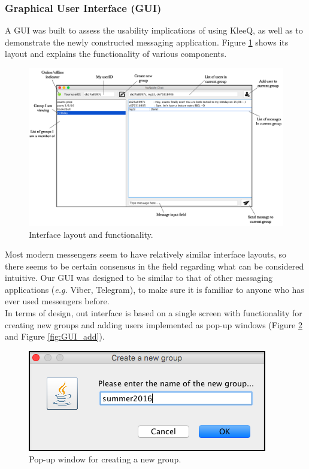 \documentclass[a4paper, 12pt]{report}
\begin{document}
\subsubsection{Graphical User Interface (GUI)}
A GUI was built to assess the usability implications of using KleeQ, as well as to demonstrate the newly constructed messaging application. Figure \ref{fig:GUI} shows its layout and explains the functionality of various components.
\begin{figure}[H]
    \captionsetup{width=0.84\textwidth}
    \centering
    \includegraphics[width=0.94\linewidth]{pics/GUI.png}
    \caption{\label{fig:GUI} Interface layout and functionality.}
\end{figure}
Most modern messengers seem to have relatively similar interface layouts, so there seems to be certain consensus in the field regarding what can be considered intuitive. Our GUI was designed to be similar to that of other messaging applications (\textit{e.g.} Viber, Telegram), to make sure it is familiar to anyone who has ever used messengers before. \\

In terms of design, out interface is based on a single screen with functionality for creating new groups and adding users implemented as pop-up windows (Figure \ref{fig:GUI_create} and Figure \ref{fig:GUI_add}).

\begin{figure}[H]
    \captionsetup{width=0.84\textwidth}
    \centering
    \includegraphics[width=0.5\linewidth]{pics/GUI_create.png}
    \caption{\label{fig:GUI_create} Pop-up window for creating a new group.}
\end{figure}
\end{document}

